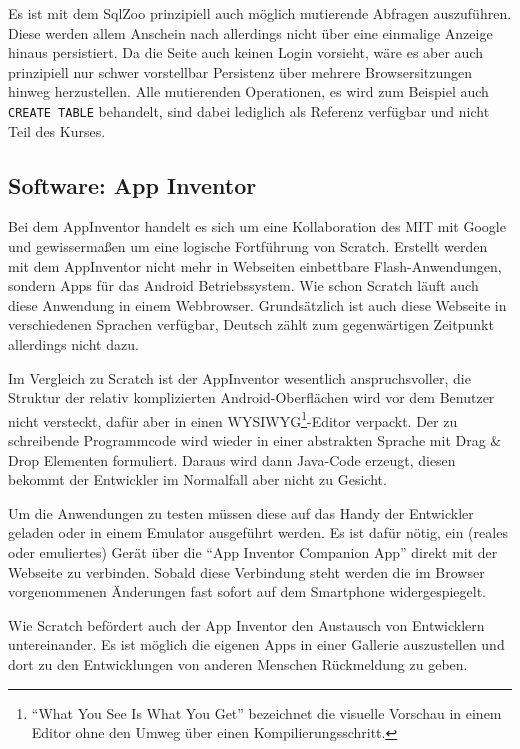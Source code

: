 Es ist mit dem SqlZoo prinzipiell auch möglich mutierende Abfragen auszuführen. Diese werden allem Anschein nach allerdings nicht über eine einmalige Anzeige hinaus persistiert. Da die Seite auch keinen Login vorsieht, wäre es aber auch prinzipiell nur schwer vorstellbar Persistenz über mehrere Browsersitzungen hinweg herzustellen. Alle mutierenden Operationen, es wird zum Beispiel auch \lstinline{CREATE TABLE} behandelt, sind dabei lediglich als Referenz verfügbar und nicht Teil des Kurses.

\subsection{Software: App Inventor}

Bei dem AppInventor handelt es sich um eine Kollaboration des MIT mit Google und gewissermaßen um eine logische Fortführung von Scratch. Erstellt werden mit dem AppInventor nicht mehr in Webseiten einbettbare Flash-Anwendungen, sondern Apps für das Android Betriebssystem. Wie schon Scratch läuft auch diese Anwendung in einem Webbrowser. Grundsätzlich ist auch diese Webseite in verschiedenen Sprachen verfügbar, Deutsch zählt zum gegenwärtigen Zeitpunkt allerdings nicht dazu.

Im Vergleich zu Scratch ist der AppInventor wesentlich anspruchsvoller, die Struktur der relativ komplizierten Android-Oberflächen wird vor dem Benutzer nicht versteckt, dafür aber in einen WYSIWYG\footnote{"`What You See Is What You Get"' bezeichnet die visuelle Vorschau in einem Editor ohne den Umweg über einen Kompilierungsschritt.}-Editor verpackt. Der zu schreibende Programmcode wird wieder in einer abstrakten Sprache mit Drag \& Drop Elementen formuliert. Daraus wird dann Java-Code erzeugt, diesen bekommt der Entwickler im Normalfall aber nicht zu Gesicht.

Um die Anwendungen zu testen müssen diese auf das Handy der Entwickler geladen oder in einem Emulator ausgeführt werden. Es ist dafür nötig, ein (reales oder emuliertes) Gerät über die "`App Inventor Companion App"' direkt mit der Webseite zu verbinden. Sobald diese Verbindung steht werden die im Browser vorgenommenen Änderungen fast sofort auf dem Smartphone widergespiegelt.

Wie Scratch befördert auch der App Inventor den Austausch von Entwicklern untereinander. Es ist möglich die eigenen Apps in einer Gallerie auszustellen und dort zu den Entwicklungen von anderen Menschen Rückmeldung zu geben.

